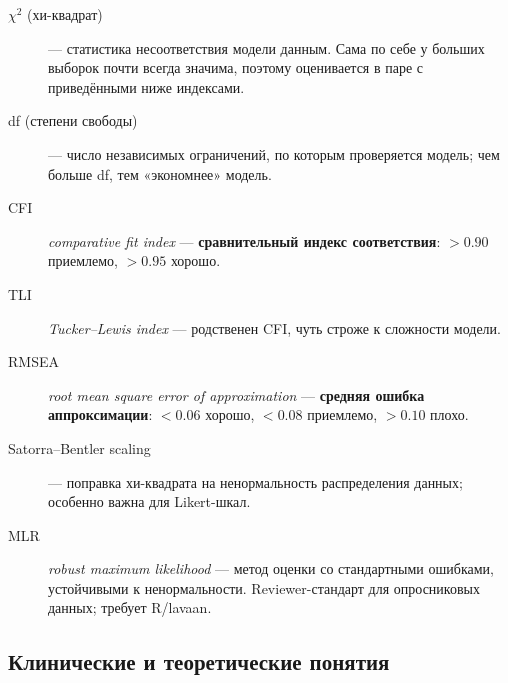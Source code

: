 \begin{description}
    \item[$\chi^2$ (хи-квадрат)] --- статистика несоответствия модели данным. Сама по себе у больших выборок почти всегда значима, поэтому оценивается в паре с приведёнными ниже индексами.
    \item[df (степени свободы)] --- число независимых ограничений, по которым проверяется модель; чем больше df, тем «экономнее» модель.
    \item[CFI] \textit{comparative fit index} --- \textbf{сравнительный индекс соответствия}: $>0.90$ приемлемо, $>0.95$ хорошо.
    \item[TLI] \textit{Tucker--Lewis index} --- родственен CFI, чуть строже к сложности модели.
    \item[RMSEA] \textit{root mean square error of approximation} --- \textbf{средняя ошибка аппроксимации}: $<0.06$ хорошо, $<0.08$ приемлемо, $>0.10$ плохо.
    \item[Satorra--Bentler scaling] --- поправка хи-квадрата на ненормальность распределения данных; особенно важна для Likert-шкал.
    \item[MLR] \textit{robust maximum likelihood} --- метод оценки со стандартными ошибками, устойчивыми к ненормальности. Reviewer-стандарт для опросниковых данных; требует R/lavaan.
\end{description}

\subsection*{Клинические и теоретические понятия}

